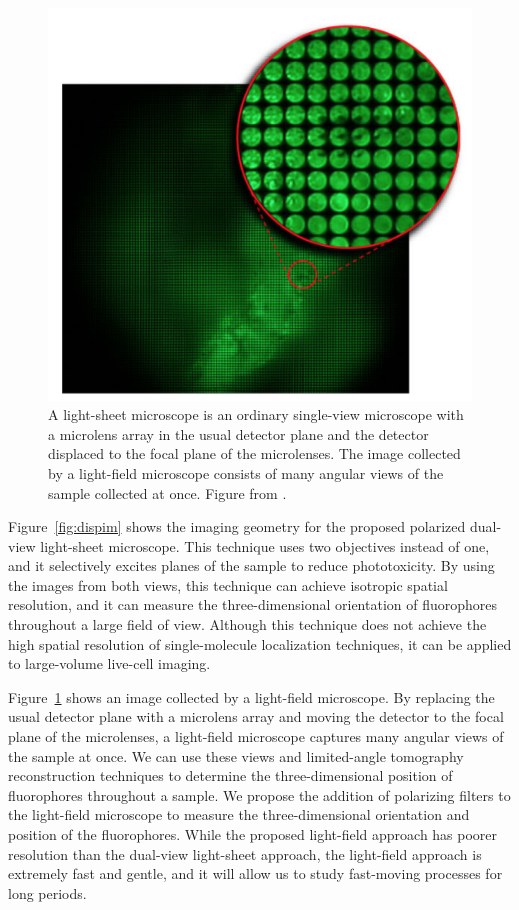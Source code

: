 \documentclass[11pt]{article}
\begin{document}
\begin{figure}[t]
\begin{minipage}{.45\textwidth}
  \centering
  \vspace{-1.8em}
  \includegraphics[width=\textwidth, interpolate=true]{figs/lf-fluo}
  \caption{A light-sheet microscope is an ordinary single-view microscope with a
    microlens array in the usual detector plane and the detector displaced to
    the focal plane of the microlenses. The image collected by a light-field
    microscope consists of many angular views of the sample collected at
    once. Figure from \cite{levoy2006}.}
  \label{fig:lf}
\end{minipage}
\end{figure}

Figure~\ref{fig:dispim} shows the imaging geometry for the proposed polarized dual-view
light-sheet microscope. This technique uses two objectives instead of one, and
it selectively excites planes of the sample to reduce phototoxicity. By using
the images from both views, this technique can achieve isotropic spatial
resolution, and it can measure the three-dimensional orientation of fluorophores
throughout a large field of view. Although this technique does not achieve the
high spatial resolution of single-molecule localization techniques, it can be
applied to large-volume live-cell imaging.

Figure~\ref{fig:lf} shows an image collected by a light-field microscope. By
replacing the usual detector plane with a microlens array and moving the
detector to the focal plane of the microlenses, a light-field microscope
captures many angular views of the sample at once. We can use these views and
limited-angle tomography reconstruction techniques to determine the
three-dimensional position of fluorophores throughout a sample. We propose the
addition of polarizing filters to the light-field microscope to measure the
three-dimensional orientation and position of the fluorophores. While the
proposed light-field approach has poorer resolution than the dual-view
light-sheet approach, the light-field approach is extremely fast and gentle, and
it will allow us to study fast-moving processes for long periods.
\end{document}
